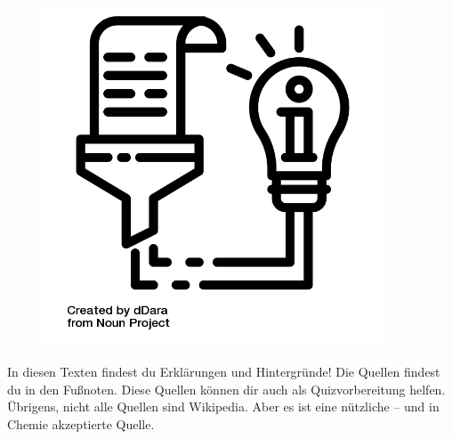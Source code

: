 \documentclass{scrartcl}  %
\begin{document}
			\begin{tcolorbox}[enhanced,
				colback=white,
				colframe=darkgray,
				fonttitle=\sffamily\bfseries\large, 
				title=Informationstexte,  %
				attach boxed title to top left={xshift=3.2mm,yshift=-0.50mm},
				boxed title style={skin=enhancedfirst jigsaw,size=small,arc=1mm,bottom=-1mm,colframe=darkgray,height=0.75cm},
				colbacktitle=darkgray,
				drop lifted shadow]
				\begin{figure}  
					\centering
					\vspace{-14pt}  %
					\includegraphics[width=0.9\textwidth]{symbols/symbol_tex_content}
				\end{figure}
				
				In diesen Texten findest du Erklärungen und Hintergründe! \newline 
				Die Quellen findest du in den Fußnoten. Diese Quellen können dir auch als Quizvorbereitung helfen. Übrigens, nicht alle Quellen sind Wikipedia. Aber es ist eine nützliche – und in Chemie akzeptierte Quelle. 
				\vspace{0.7cm}  %
			\end{tcolorbox}
\end{document}
